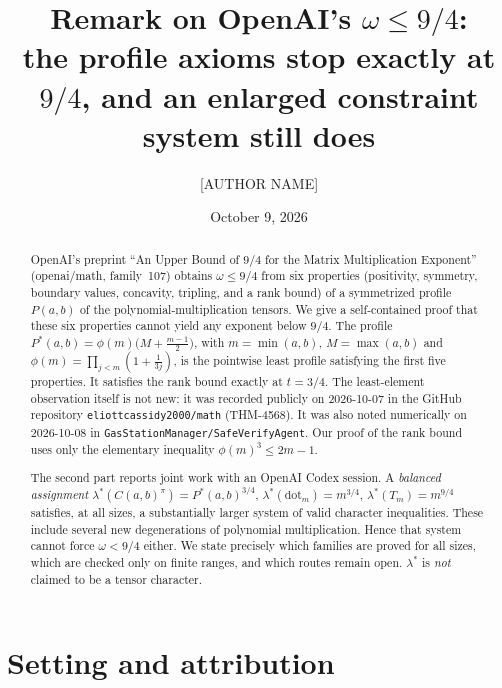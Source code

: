 \documentclass[11pt]{amsart}
\title[The axioms behind $\omega\le 9/4$ stop at $9/4$]{Remark on OpenAI's $\omega\le 9/4$:\\
the profile axioms stop exactly at $9/4$, and an enlarged constraint system still does}
\author{[AUTHOR NAME]}
\date{October 9, 2026}
\theoremstyle{remark}
\begin{document}
\begin{abstract}
OpenAI's preprint ``An Upper Bound of $9/4$ for the Matrix Multiplication
Exponent'' (openai/math, family~107) obtains $\omega\le 9/4$ from six
properties (positivity, symmetry, boundary values, concavity, tripling, and
a rank bound) of a symmetrized profile $P(a,b)$ of the polynomial-multiplication
tensors. We give a self-contained proof that these six properties cannot
yield any exponent below $9/4$. The profile
$P^*(a,b)=\phi(m)\bigl(M+\tfrac{m-1}{2}\bigr)$, with $m=\min(a,b)$,
$M=\max(a,b)$ and $\phi(m)=\prod_{j<m}(1+\tfrac1{3j})$, is the pointwise least
profile satisfying the first five properties. It satisfies the rank
bound exactly at $t=3/4$. The least-element observation itself is not new: it
was recorded publicly on 2026-10-07 in the GitHub repository
\texttt{eliottcassidy2000/math} (THM-4568). It was also noted numerically on
2026-10-08 in \texttt{GasStationManager/SafeVerifyAgent}. Our proof of the
rank bound uses only the elementary inequality $\phi(m)^3\le 2m-1$.

The second part reports joint work with an OpenAI Codex session. A
\emph{balanced assignment}
$\lambda^*(C(a,b)^\pi)=P^*(a,b)^{3/4}$, $\lambda^*(\text{dot}_m)=m^{3/4}$,
$\lambda^*(T_m)=m^{9/4}$ satisfies, at all sizes, a substantially larger
system of valid character inequalities. These include several new
degenerations of polynomial multiplication. Hence that system cannot force
$\omega<9/4$ either. We state precisely which families are proved for all
sizes, which are checked only on finite ranges, and which routes remain open.
$\lambda^*$ is \emph{not} claimed to be a tensor character.
\end{abstract}

\maketitle

\section{Setting and attribution}
\end{document}
